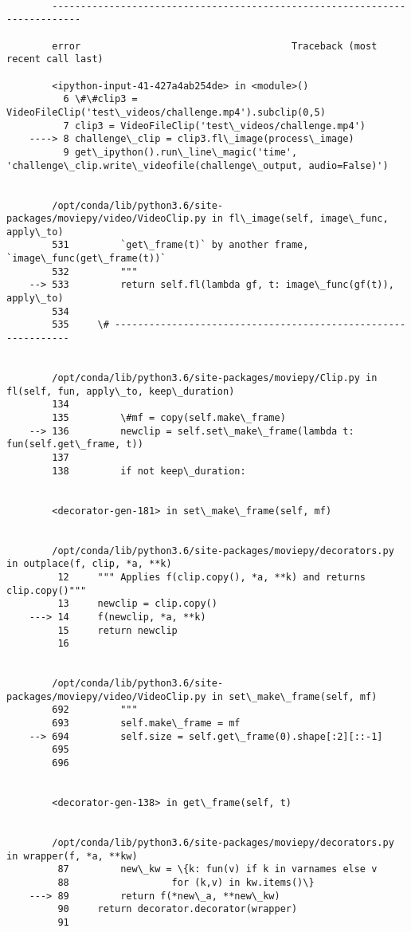 \documentclass[11pt]{article}
\begin{document}
    \begin{Verbatim}[commandchars=\\\{\}]

        ---------------------------------------------------------------------------

        error                                     Traceback (most recent call last)

        <ipython-input-41-427a4ab254de> in <module>()
          6 \#\#clip3 = VideoFileClip('test\_videos/challenge.mp4').subclip(0,5)
          7 clip3 = VideoFileClip('test\_videos/challenge.mp4')
    ----> 8 challenge\_clip = clip3.fl\_image(process\_image)
          9 get\_ipython().run\_line\_magic('time', 'challenge\_clip.write\_videofile(challenge\_output, audio=False)')


        /opt/conda/lib/python3.6/site-packages/moviepy/video/VideoClip.py in fl\_image(self, image\_func, apply\_to)
        531         `get\_frame(t)` by another frame,  `image\_func(get\_frame(t))`
        532         """
    --> 533         return self.fl(lambda gf, t: image\_func(gf(t)), apply\_to)
        534 
        535     \# --------------------------------------------------------------


        /opt/conda/lib/python3.6/site-packages/moviepy/Clip.py in fl(self, fun, apply\_to, keep\_duration)
        134 
        135         \#mf = copy(self.make\_frame)
    --> 136         newclip = self.set\_make\_frame(lambda t: fun(self.get\_frame, t))
        137 
        138         if not keep\_duration:


        <decorator-gen-181> in set\_make\_frame(self, mf)


        /opt/conda/lib/python3.6/site-packages/moviepy/decorators.py in outplace(f, clip, *a, **k)
         12     """ Applies f(clip.copy(), *a, **k) and returns clip.copy()"""
         13     newclip = clip.copy()
    ---> 14     f(newclip, *a, **k)
         15     return newclip
         16 


        /opt/conda/lib/python3.6/site-packages/moviepy/video/VideoClip.py in set\_make\_frame(self, mf)
        692         """
        693         self.make\_frame = mf
    --> 694         self.size = self.get\_frame(0).shape[:2][::-1]
        695 
        696 


        <decorator-gen-138> in get\_frame(self, t)


        /opt/conda/lib/python3.6/site-packages/moviepy/decorators.py in wrapper(f, *a, **kw)
         87         new\_kw = \{k: fun(v) if k in varnames else v
         88                  for (k,v) in kw.items()\}
    ---> 89         return f(*new\_a, **new\_kw)
         90     return decorator.decorator(wrapper)
         91 



\end{Verbatim}
\end{document}
